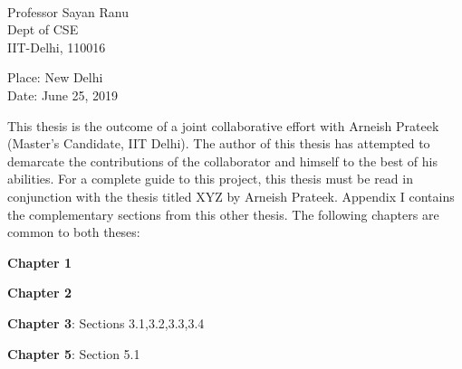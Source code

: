 \documentclass[MTech]{iitddiss}
\begin{document}
\vspace*{1.5in}

\begin{singlespacing}
\hspace*{-0.25in}
\parbox{2.5in}{
 \\
\noindent Professor Sayan Ranu\\
\noindent Dept of CSE\\
\noindent IIT-Delhi, 110016 \\
}
\hspace*{1.0in}
\end{singlespacing}
\vspace*{0.25in}
\noindent \hfill Place: New Delhi\\
\noindent \hfill Date: June 25, 2019\\


\acknowledgements

This thesis is the outcome of a joint collaborative effort with Arneish Prateek (Master's Candidate, IIT Delhi). The author of this thesis has attempted to demarcate the contributions of the collaborator and himself to the best of his abilities. For a complete guide to this project, this thesis must be read in conjunction with the thesis titled XYZ by Arneish Prateek. Appendix I contains the complementary sections from this other thesis. The following chapters are common to both theses:

\textbf{Chapter 1}

\textbf{Chapter 2}

\textbf{Chapter 3}: Sections 3.1,3.2,3.3,3.4

\textbf{Chapter 5}: Section 5.1
\end{document}
